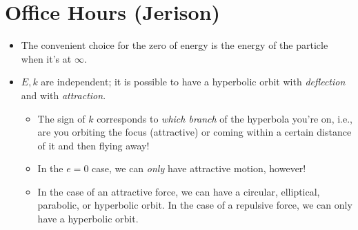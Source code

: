 \documentclass[../notes.tex]{subfiles}
\begin{document}
\section{Office Hours (Jerison)}
\begin{itemize}
    \item The convenient choice for the zero of energy is the energy of the particle when it's at $\infty$.
    \item $E,k$ are independent; it is possible to have a hyperbolic orbit with \emph{deflection} and with \emph{attraction}.
    \begin{itemize}
        \item The sign of $k$ corresponds to \emph{which branch} of the hyperbola you're on, i.e., are you orbiting the focus (attractive) or coming within a certain distance of it and then flying away!
        \item In the $e=0$ case, we can \emph{only} have attractive motion, however!
        \item In the case of an attractive force, we can have a circular, elliptical, parabolic, or hyperbolic orbit. In the case of a repulsive force, we can only have a hyperbolic orbit.
    \end{itemize}
\end{itemize}
\end{document}
